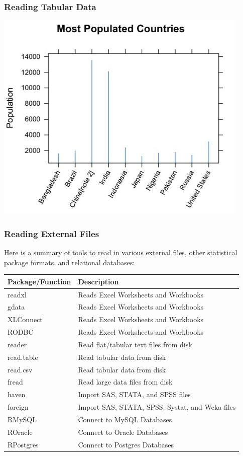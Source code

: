 \documentclass{beamer}
\begin{document}
%
\begin{frame}[fragile]
\frametitle{Reading Tabular Data}
\begin{center}
\includegraphics{../IMG/world.png}
\end{center}
\end{frame}


\begin{frame}[fragile]
\frametitle{Reading External Files}
Here is a summary of tools to read in various external files, other statistical package formats, and relational databases:
\newline
\footnotesize

\begin{tabular}{| l | l |}
  \hline         
  \textbf{Package/Function} & \textbf{Description} \\ \hline
  readxl & Reads Excel Worksheets and Workbooks \\ \hline
  gdata  & Reads Excel Worksheets and Workbooks    \\ \hline
  XLConnect & Reads Excel Worksheets and Workbooks \\ \hline
   RODBC & Reads Excel Worksheets and Workbooks  \\ \hline
  reader & Read flat/tabular text files from disk \\ \hline
  read.table & Read tabular data from disk \\ \hline
  read.csv & Read tabular data from disk  \\ \hline
  fread & Read large data files from disk  \\ \hline
  haven & Import SAS, STATA, and SPSS files \\ \hline
  foreign & Import SAS, STATA, SPSS, Systat, and Weka files \\ \hline
  RMySQL & Connect to MySQL Databases \\ \hline
  ROracle & Connect to Oracle Databases \\ \hline
  RPostgres & Connect to Postgres Databases \\ \hline
  \hline  
\end{tabular}

\end{frame}
\end{document}
